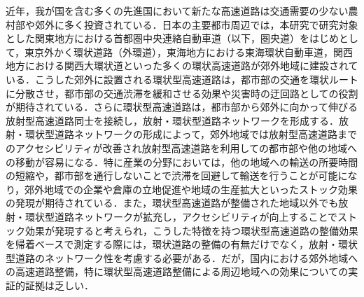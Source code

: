 近年，我が国を含む多くの先進国において新たな高速道路は交通需要の少ない農村部や郊外に多く投資されている．日本の主要都市周辺では，本研究で研究対象とした関東地方における首都圏中央連絡自動車道（以下，圏央道）をはじめとして，東京外かく環状道路（外環道），東海地方における東海環状自動車道，関西地方における関西大環状道といった多くの環状高速道路が郊外地域に建設されている．こうした郊外に設置される環状型高速道路は，都市部の交通を環状ルートに分散させ，都市部の交通渋滞を緩和させる効果や災害時の迂回路としての役割が期待されている．さらに環状型高速道路は，都市部から郊外に向かって伸びる放射型高速道路同士を接続し，放射・環状型道路ネットワークを形成する．放射・環状型道路ネットワークの形成によって，郊外地域では放射型高速道路までのアクセシビリティが改善され放射型高速道路を利用しての都市部や他の地域への移動が容易になる．特に産業の分野においては，他の地域への輸送の所要時間の短縮や，都市部を通行しないことで渋滞を回避して輸送を行うことが可能になり，郊外地域での企業や倉庫の立地促進や地域の生産拡大といったストック効果の発現が期待されている．また，環状型高速道路が整備された地域以外でも放射・環状型道路ネットワークが拡充し，アクセシビリティが向上することでストック効果が発現すると考えられ，こうした特徴を持つ環状型高速道路の整備効果を帰着ベースで測定する際には，環状道路の整備の有無だけでなく，放射・環状型道路のネットワーク性を考慮する必要がある．だが，国内における郊外地域への高速道路整備，特に環状型高速道路整備による周辺地域への効果についての実証的証拠は乏しい．
